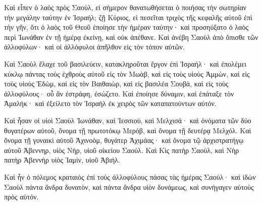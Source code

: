 {Καὶ εἶπεν ὁ λαὸς πρὸς Σαοὺλ, εἰ σήμερον θανατωθήσεται ὁ ποιήσας τὴν σωτηρίαν τὴν μεγάλην ταύτην ἐν Ἰσραήλ; ζῇ Κύριος, εἰ πεσεῖται τριχὸς τῆς κεφαλῆς αὐτοῦ ἐπὶ τὴν γῆν, ὅτι ὁ λαὸς τοῦ Θεοῦ ἐποίησε τὴν ἡμέραν ταύτην· καὶ προσηύξατο ὁ λαὸς περὶ Ἰωνάθαν ἐν τῇ ἡμέρᾳ ἐκείνῃ, καὶ οὐκ ἀπέθανε.
Καὶ ἀνέβη Σαοὺλ ἀπὸ ὄπισθε τῶν ἀλλοφύλων· καὶ οἱ ἀλλόφυλοι ἀπῆλθον εἰς τὸν τόπον αὐτῶν.
\par }{\PP {}Καὶ Σαοὺλ ἔλαχε τοῦ βασιλεύειν, κατακληροῦται ἔργον ἐπὶ Ἰσραήλ· καὶ ἐπολέμει κύκλῳ πάντας τοὺς ἐχθροὺς αὐτοῦ εἰς τὸν Μωὰβ, καὶ εἰς τοὺς υἱοὺς Ἀμμὼν, καὶ εἰς τοὺς υἱοὺς Ἐδὼμ, καὶ εἰς τὸν Βαιθαιὼρ, καὶ εἰς βασιλέα Σουβὰ, καὶ εἰς τοὺς ἀλλοφύλους· οὗ ἂν ἐστράφη, ἐσώζετο.
Καὶ ἐποίησε δύναμιν, καὶ ἐπάταξε τὸν Ἀμαλήκ· καὶ ἐξείλετο τὸν Ἰσραὴλ ἐκ χειρὸς τῶν καταπατούντων αὐτόν.
\par }{\PP {}Καὶ ἦσαν οἱ υἱοὶ Σαοὺλ Ἰωνάθαν, καὶ Ἰεσσιοὺ, καὶ Μελχισά· καὶ ὀνόματα τῶν δύο θυγατέρων αὐτοῦ, ὄνομα τῇ πρωτοτόκῳ Μερόβ, καὶ ὄνομα τῇ δευτέρᾳ Μελχόλ.
Καὶ ὄνομα τῇ γυναικὶ αὐτοῦ Ἀχινοὸμ, θυγάτερ Ἀχιμάας· καὶ ὄνομα τῷ ἀρχιστρατήγῳ αὐτοῦ Ἀβεννηρ, υἱὸς Νὴρ, υἱοῦ οἰκείου Σαούλ.
Καὶ Κὶς πατὴρ Σαοὺλ, καὶ Νὴρ πατὴρ Ἀβεννὴρ υἱὸς Ἰαμὶν, υἱοῦ Ἀβιήλ.
\par }{\PP {}Καὶ ἦν ὁ πόλεμος κραταιὸς ἐπὶ τοὺς ἀλλοφύλους πάσας τὰς ἡμέρας Σαούλ· καὶ ἰδὼν Σαοὺλ πάντα ἄνδρα δυνατὸν, καὶ πάντα ἄνδρα υἱὸν δυνάμεως, καὶ συνήγαγεν αὐτοὺς πρὸς αὑτόν.

}
